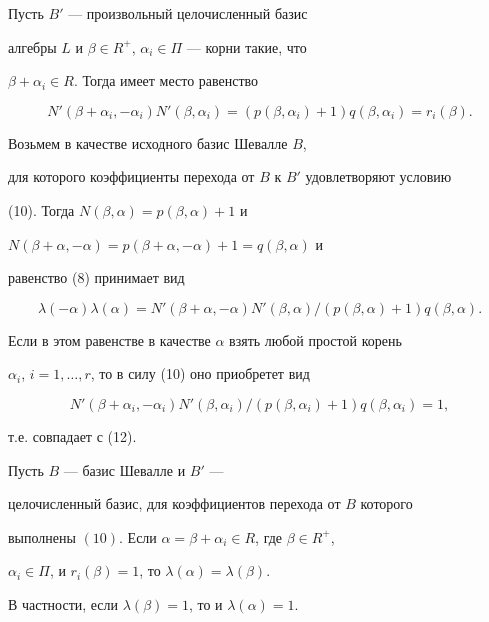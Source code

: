 \begin{lem}


Пусть $B'$ --- произвольный целочисленный базис


алгебры $L$ и $\beta\in R^+$, $\alpha_i\in\Pi$ --- корни такие, что


$\beta+\alpha_i\in R$. Тогда имеет место равенство


\begin{equation}


N'(\beta+\alpha_i,-\alpha_i)N'(\beta,\alpha_i)=


(p(\beta,\alpha_i)+1)q(\beta,\alpha_i)=r_i(\beta).


\end{equation}


\end{lem}





\begin{pf}


Возьмем в качестве исходного базис Шевалле $B$,


для которого коэффициенты перехода от $B$ к $B'$ удовлетворяют условию


(10). Тогда $N(\beta,\alpha)=p(\beta,\alpha)+1$ и


$N(\beta+\alpha,-\alpha)=p(\beta+\alpha,-\alpha)+1=q(\beta,\alpha)$ и


равенство (8) принимает вид


$$


\lambda(-\alpha)\lambda(\alpha)=N'(\beta+\alpha,-\alpha)


N'(\beta,\alpha)/(p(\beta,\alpha)+1)q(\beta,\alpha).


$$


Если в этом равенстве в качестве $\alpha$  взять любой простой корень


$\alpha_i$, $i=1,\dotsc,r$, то в силу (10) оно приобретет вид


$$


N'(\beta+\alpha_i,-\alpha_i)N'(\beta,\alpha_i)/


(p(\beta,\alpha_i)+1)q(\beta,\alpha_i)=1,


$$


т.е. совпадает с (12).


\end{pf}





\begin{lem}


Пусть $B$ --- базис Шевалле и $B'$ ---


целочисленный базис, для коэффициентов перехода от $B$ которого


выполнены $(10)$. Если $\alpha=\beta+\alpha_i\in R$, где $\beta\in R^+$,


$\alpha_i\in\Pi$, и $r_i(\beta)=1$, то $\lambda(\alpha)=\lambda(\beta)$.


В частности, если $\lambda(\beta)=1$, то и $\lambda(\alpha)=1$.


\end{lem}






